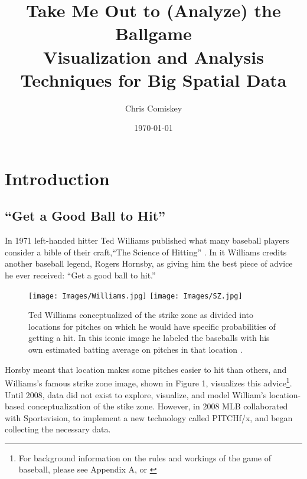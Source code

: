 \documentclass{article}
\title{Take Me Out to (Analyze) the Ballgame \\ Visualization and Analysis Techniques for Big Spatial Data}
\author{Chris Comiskey}
\date{\today}
\begin{document}
\maketitle{}

\tableofcontents


\section{Introduction} %

\subsection{``Get a Good Ball to Hit''}
In 1971 left-handed hitter Ted Williams published what many baseball players consider a bible of their craft,``The Science of Hitting'' \citep{Williams1971}. In it Williams credits another baseball legend, Rogers Hornsby, as giving him the best piece of advice he ever received: ``Get a good ball to hit.''
        \begin{figure}[H]
      	\centering
      	\texttt{[image: Images/Williams.jpg]} 
      	\texttt{[image: Images/SZ.jpg]}
      	\caption{Ted Williams conceptualized of the strike zone as divided into locations for pitches on which he would have specific probabilities of getting a hit. In this iconic image he labeled the baseballs with his own estimated batting average on pitches in that location \citep{Williams1971}.}
      	\end{figure} 
Horsby meant that location makes some pitches easier to hit than others, and  Williams's famous strike zone image, shown in Figure 1, visualizes this advice\footnote{For background information on the rules and workings of the game of baseball, please see Appendix A, or \citep{Wiki}}. Until 2008, data did not exist to explore, visualize, and model William's location-based conceptualization of the stike zone. However, in 2008 MLB collaborated with Sportsvision, to implement a new technology called PITCHf/x\textsuperscript{\textregistered}, and began collecting the necessary data.
\end{document}
